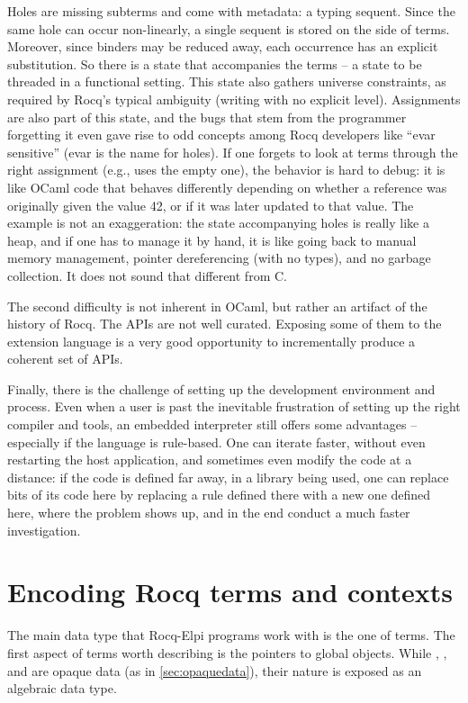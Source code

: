 \documentclass[a4paper, 11pt]{book}
\begin{document}
Holes are missing subterms and come with metadata: a typing sequent. Since the
same hole can occur non-linearly, a single sequent is stored on the side of
terms. Moreover, since binders may be reduced away, each occurrence has an
explicit substitution. So there is a state that accompanies the terms -- a state
to be threaded in a functional setting. This state also gathers universe
constraints, as required by Rocq's typical ambiguity (writing  with
no explicit level).
Assignments are also part of this state, and the bugs that stem from the
programmer forgetting it even gave rise to odd concepts among Rocq developers
like ``evar sensitive'' (evar is the name for holes). If one forgets to look at
terms through the right assignment (e.g., uses the empty one), the behavior is
hard to debug: it is like OCaml code that behaves differently depending on
whether a reference  was originally given the value 42, or if it was
later updated to that value.
The example is not an exaggeration: the state accompanying holes is really like
a heap, and if one has to manage it by hand, it is like going back to manual
memory management, pointer dereferencing (with no types), and no garbage
collection. It does not sound that different from C.

The second difficulty is not inherent in OCaml, but rather an artifact of the
history of Rocq. The APIs are not well curated. Exposing some of them to the
extension language is a very good opportunity to incrementally produce a
coherent set of APIs.

Finally, there is the challenge of setting up the development environment and
process. Even when a user is past the inevitable frustration of setting up the
right compiler and tools, an embedded interpreter still offers some
advantages -- especially if the language is rule-based. One can iterate faster,
without even restarting the host application, and sometimes even modify the
code at a distance: if the code is defined far away, in a library being used,
one can replace bits of its code here by replacing a rule defined there with a
new one defined here, where the problem shows up, and in the end conduct a
much faster investigation.

\section{Encoding Rocq terms and contexts}\label{GALLINA}


The main data type that Rocq-Elpi programs work with is the one of terms. The
first aspect of terms worth describing is the pointers to global objects.
While , , and  are opaque
data (as in \cref{sec:opaquedata}), their nature is exposed as an algebraic
data type.
\end{document}
